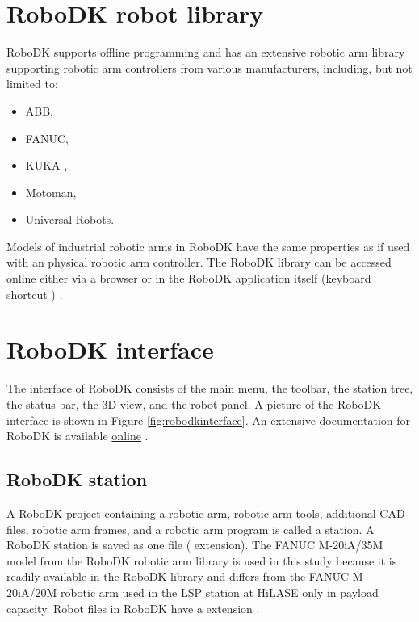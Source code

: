 \section{RoboDK robot library}

RoboDK supports offline programming and has an extensive robotic arm library supporting robotic arm controllers from various manufacturers, including, but not limited to:

\begin{itemize}
    \item ABB, 
    \item FANUC, 
    \item KUKA ,
    \item Motoman, 
    \item Universal Robots.
\end{itemize}
Models of industrial robotic arms in RoboDK have the same properties as if used with an physical robotic arm controller. The RoboDK library can be accessed \href{https://robodk.com/library}{online} either via a browser or in the RoboDK application itself (keyboard shortcut ) \cite{robodklibrary}.


\section{RoboDK interface}

The interface of RoboDK consists of the main menu, the toolbar, the station tree, the status bar, the 3D view, and the robot panel. A picture of the RoboDK interface is shown in Figure \ref{fig:robodkinterface}. An extensive documentation for RoboDK is available \href{https://robodk.com/doc/en/Basic-Guide.html#Start}{online} \cite{robodkinterface}.

\subsection{RoboDK station}

A RoboDK project containing a robotic arm, robotic arm tools, additional CAD files, robotic arm frames, and a robotic arm program is called a station. A RoboDK station is saved as one file ( extension).  The FANUC M-20iA/35M model from the RoboDK robotic arm library is used in this study because it is readily available in the RoboDK library and differs from the FANUC M-20iA/20M robotic arm used in the LSP station at HiLASE only in payload capacity. Robot files in RoboDK have a  extension \cite{robodkstation}.

